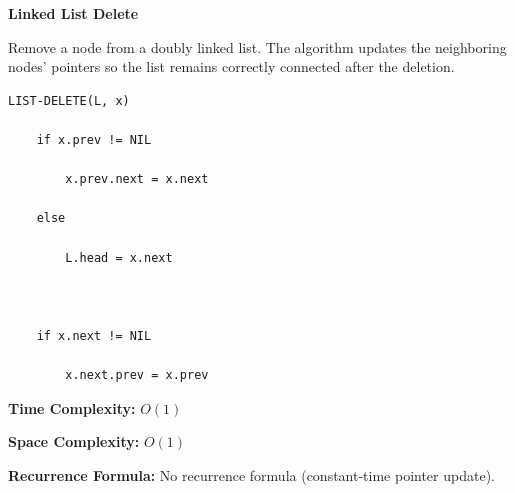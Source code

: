 \documentclass[a4paper,12pt]{article}
\begin{document}
\begin{tcolorbox}[
    colback=gray!30,
    colframe=black,
    boxrule=1pt,
    arc=0mm
]

\begin{tcolorbox}[
    colback=gray!10,
    colframe=black,
    arc=0mm
]
\centering
{\Huge\bfseries Linked List Delete}
\end{tcolorbox}


\begin{tcolorbox}[
    colback=gray!10,
    colframe=black,
    arc=0mm
]
\small
Remove a node from a doubly linked list.
The algorithm updates the neighboring nodes' pointers so the list
remains correctly connected after the deletion.
\end{tcolorbox}


\begin{tcolorbox}[
    colback=black!5,
    colframe=black,
    arc=0mm,
    title=Pseudo-code
]
\tiny
\begin{lstlisting}
LIST-DELETE(L, x)

    if x.prev != NIL

        x.prev.next = x.next

    else

        L.head = x.next



    if x.next != NIL

        x.next.prev = x.prev
\end{lstlisting}
\end{tcolorbox}


\begin{tcolorbox}[
    colback=cyan!20,
    colframe=black,
    arc=0mm
]
\small
\textbf{Time Complexity:}
$O(1)$
\end{tcolorbox}


\begin{tcolorbox}[
    colback=violet!20,
    colframe=black,
    arc=0mm
]
\small
\textbf{Space Complexity:}
$O(1)$
\end{tcolorbox}


\begin{tcolorbox}[
    colback=pink!20,
    colframe=black,
    arc=0mm
]
\small
\textbf{Recurrence Formula:}
No recurrence formula (constant-time pointer update).
\end{tcolorbox}

\end{tcolorbox}
\end{document}
